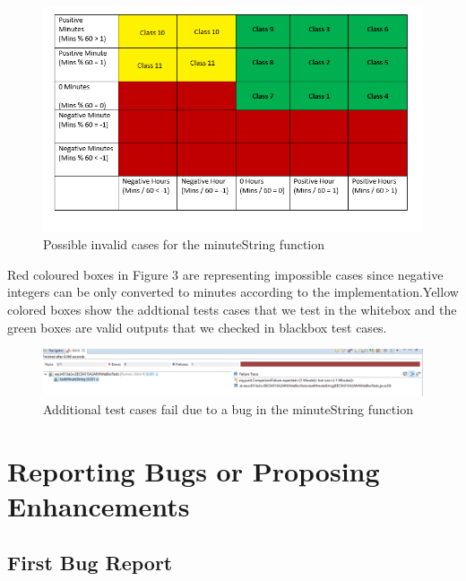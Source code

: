 \documentclass[fontsize=12pt,paper=letter,twoside]{scrartcl}
\begin{document}
\begin{itemize}
\begin{figure}[!htb]
\begin{center}
\includegraphics[width=.99\textwidth]{images/wbt/ect/wbtmatrix.png}
\end{center}
\caption{Possible invalid cases for the minuteString function}
\label{fig:wbt_ect_cfg}
\end{figure}
Red coloured boxes in Figure 3 are representing impossible cases since negative integers can be only converted to minutes according to the implementation.Yellow colored boxes show the addtional tests cases that we test in the whitebox and the green boxes are valid outputs that we checked in blackbox test cases.

\begin{figure}[!htb]
\begin{center}
\includegraphics[width=.99\textwidth]{images/wbt/ect/bug.png}
\end{center}
\caption{Additional test cases fail due to a bug in the minuteString function}
\label{fig:wbt_ect_bug}
\end{figure}
\newpage
\newpage



\section{Reporting Bugs or Proposing Enhancements}

\subsection{First Bug Report}


\end{itemize}
\end{document}

